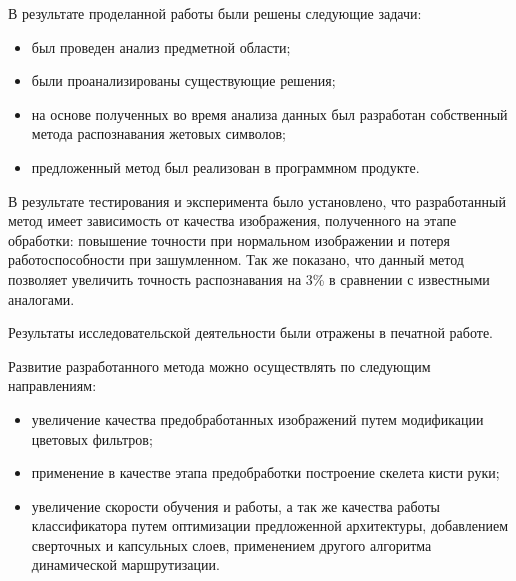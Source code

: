 \Conclusion %

В результате проделанной работы были решены следующие задачи:

\begin{itemize}
	\item был проведен анализ предметной области;
	\item были проанализированы существующие решения;
	\item на основе полученных во время анализа данных был разработан собственный метода распознавания жетовых символов;
	\item предложенный метод был реализован в программном продукте.
\end{itemize}

В результате тестирования и эксперимента было установлено, что разработанный метод имеет зависимость от качества изображения, полученного на этапе обработки: повышение точности при нормальном изображении и потеря работоспособности при зашумленном. Так же показано, что данный метод позволяет увеличить точность распознавания на 3\% в сравнении с известными аналогами.

Результаты исследовательской деятельности были отражены в печатной работе\cite{Tantsevov}.

Развитие разработанного метода можно осуществлять по следующим направлениям:

\begin{itemize}
	\item увеличение качества предобработанных изображений путем модификации цветовых фильтров;
	\item применение в качестве этапа предобработки построение скелета кисти руки;
	\item увеличение скорости обучения и работы, а так же качества работы классификатора путем оптимизации предложенной архитектуры, добавлением сверточных и капсульных слоев, применением другого алгоритма динамической маршрутизации.
\end{itemize}

